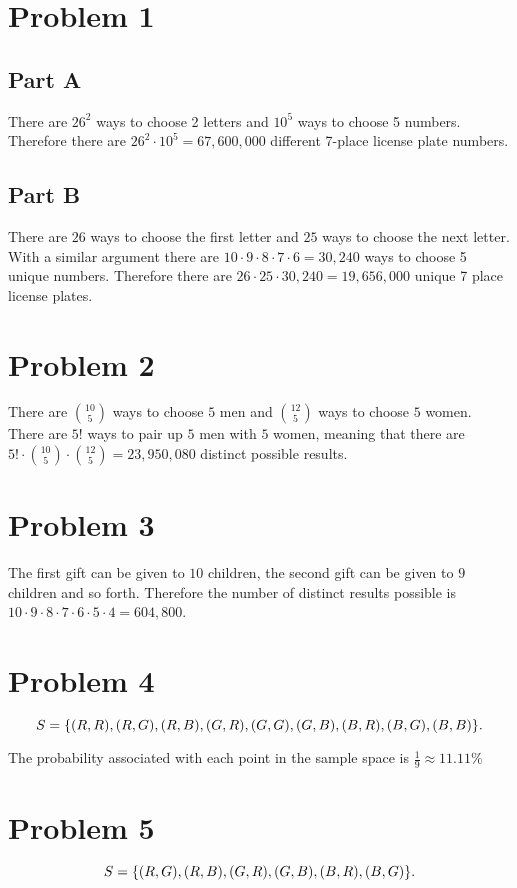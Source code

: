 \documentclass[12pt]{extarticle}
\begin{document}
\section*{Problem 1}
\subsection*{Part A}

There are $26^2$ ways to choose 2 letters and $10^5$ ways to choose 5 numbers. Therefore there are $26^2 \cdot 10^5 = 67,600,000$ different 7-place license plate numbers.

\subsection*{Part B}
There are $26$ ways to choose the first letter and $25$ ways to choose the next letter. With a similar argument there are $10\cdot 9\cdot 8\cdot 7\cdot 6 = 30,240$ ways to choose 5 unique numbers. Therefore there are $26\cdot 25 \cdot 30,240 = 19,656,000$ unique 7 place license plates.

\section*{Problem 2}
There are $\binom{10}{5}$ ways to choose $5$ men and $\binom{12}{5}$ ways to choose $5$ women. There are $5!$ ways to pair up $5$ men with $5$ women, meaning that there are $5! \cdot \binom{10}{5} \cdot \binom{12}{5} = 23,950,080$ distinct possible results.

\section*{Problem 3}
The first gift can be given to $10$ children, the second gift can be given to $9$ children and so forth. Therefore the number of distinct results possible is $10\cdot 9 \cdot 8\cdot 7 \cdot 6\cdot 5\cdot 4 = 604,800$. 

\section*{Problem 4}
\[
	S = \qty{
		(R, R),
		(R, G),
		(R, B),
		(G, R),
		(G, G),
		(G, B),
		(B, R),
		(B, G),
		(B, B)
	}
.\]

The probability associated with each point in the sample space is $\frac{1}{9} \approx 11.11\%$

\section*{Problem 5}
\[
	S = \qty{
		(R, G),
		(R, B),
		(G, R),
		(G, B),
		(B, R),
		(B, G)
	}
.\]
\end{document}
